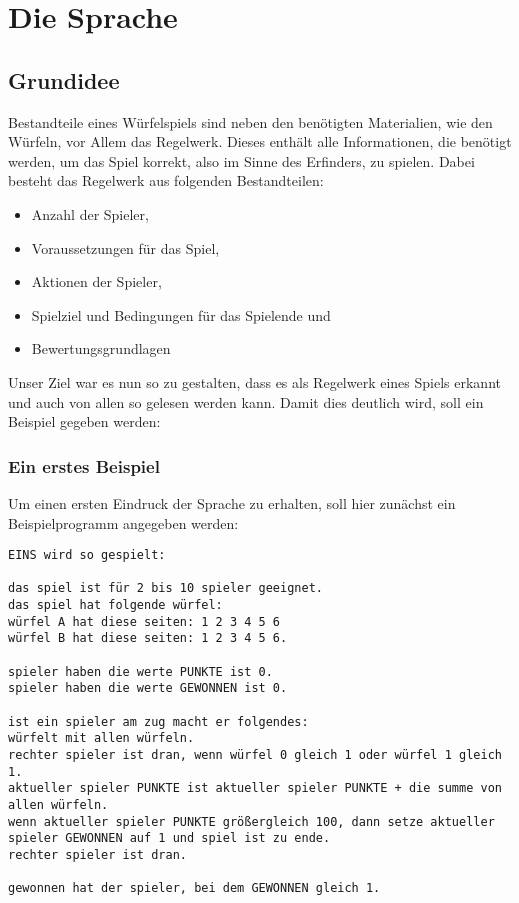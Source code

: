 
\chapter{Die Sprache}
\label{cha:die_sprache}

\section{Grundidee}
\label{sec:grundidee}
	Bestandteile eines Würfelspiels sind neben den benötigten Materialien, wie den Würfeln, vor Allem das Regelwerk. Dieses enthält alle Informationen, die benötigt werden, um das Spiel korrekt, also im Sinne des Erfinders, zu spielen. Dabei besteht das Regelwerk aus folgenden Bestandteilen:
	\begin{itemize}
		\item Anzahl der Spieler,
		\item Voraussetzungen für das Spiel,
		\item Aktionen der Spieler,
		\item Spielziel und Bedingungen für das Spielende und
		\item Bewertungsgrundlagen
	\end{itemize}
	Unser Ziel war es nun \dg so zu gestalten, dass es als Regelwerk eines Spiels erkannt und auch von allen so gelesen werden kann. Damit dies deutlich wird, soll ein Beispiel gegeben werden:

	\subsection{Ein erstes Beispiel}
	\label{sub:ein_erstes_beispiel}
		Um einen ersten Eindruck der Sprache zu erhalten, soll hier zunächst ein Beispielprogramm angegeben werden:\\
\begin{lstlisting}
EINS wird so gespielt:

das spiel ist für 2 bis 10 spieler geeignet.
das spiel hat folgende würfel:
würfel A hat diese seiten: 1 2 3 4 5 6
würfel B hat diese seiten: 1 2 3 4 5 6.

spieler haben die werte PUNKTE ist 0.
spieler haben die werte GEWONNEN ist 0.

ist ein spieler am zug macht er folgendes:
würfelt mit allen würfeln.
rechter spieler ist dran, wenn würfel 0 gleich 1 oder würfel 1 gleich 1.
aktueller spieler PUNKTE ist aktueller spieler PUNKTE + die summe von allen würfeln.
wenn aktueller spieler PUNKTE größergleich 100, dann setze aktueller spieler GEWONNEN auf 1 und spiel ist zu ende.
rechter spieler ist dran.

gewonnen hat der spieler, bei dem GEWONNEN gleich 1.
\end{lstlisting}

